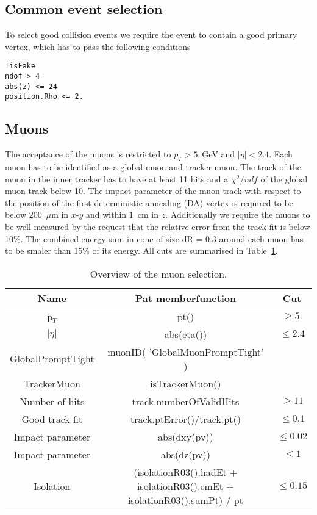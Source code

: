 \subsection{Common event selection}\label{sec:cleanup}
To select good collision events we require the event to contain a good primary vertex,
which has to pass the following conditions
\begin{verbatim}
!isFake
ndof > 4
abs(z) <= 24
position.Rho <= 2.
\end{verbatim}

\subsection{Muons}\label{sec:muons}

 The acceptance of the muons is restricted to $p_T>5$~GeV %
and $|\eta|<2.4$. 
Each muon has to be identified as a global muon and tracker muon. 
The track of the muon in the inner tracker has to have at least 11 hits
and a $\chi^2/ndf$ of the global muon track below 10. 
The impact parameter of the muon track with respect to the position of the first 
deterministic annealing (DA) vertex is 
required to be below $200$~$\mu$m in $x$-$y$ and within $1$~cm in $z$.
Additionally we require the muons to be well measured by the request that the
relative error from the track-fit is below 10\%. 
The combined energy sum in cone of size dR = 0.3 around each muon has
to be smaler than 15\% of its energy.
All cuts are summarised in Table~\ref{tab:Muons}.

    \begin{table}[hbtp]
    \caption{Overview of the muon selection.\label{tab:Muons}}
    \vspace{0.4cm}
    \begin{center}
    \begin{tabular}{|c||c||c|} \hline
Name&Pat memberfunction & Cut\\\hline \hline
p$_{T}$ & pt() & $\ge 5.$ \\\hline 
$|\eta|$ & abs(eta()) & $\le 2.4$ \\\hline 
GlobalPromptTight& muonID( 'GlobalMuonPromptTight' ) & \\\hline 
TrackerMuon& isTrackerMuon() & \\\hline 
Number of hits& track.numberOfValidHits  & $\ge 11$\\\hline 
Good track fit& track.ptError()/track.pt()  & $\leq 0.1$\\\hline 
Impact parameter& abs(dxy(pv))  & $ \le 0.02$\\\hline 
Impact parameter& abs(dz(pv))  & $ \le 1$\\\hline 
Isolation& (isolationR03().hadEt + isolationR03().emEt + isolationR03().sumPt) / pt  & $\le 0.15$\\\hline 
\end{tabular}
    \end{center}
    \end{table}


